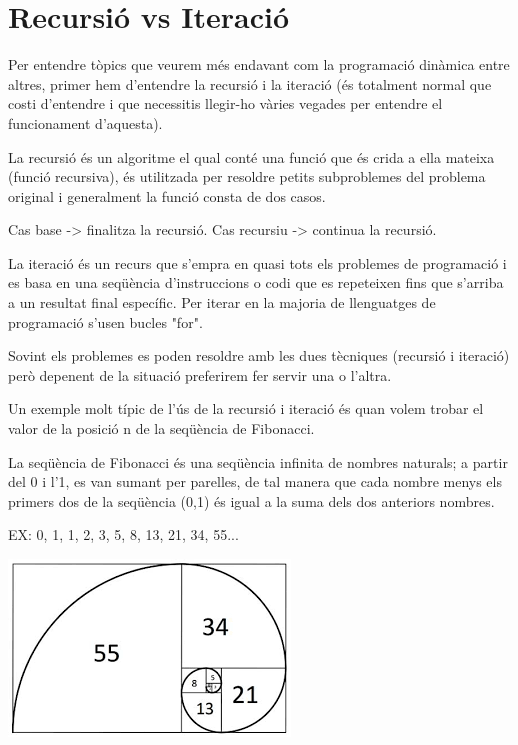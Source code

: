 \section{Recursió vs Iteració}

Per entendre tòpics que veurem més endavant com la programació dinàmica entre altres, primer hem d'entendre la recursió i la iteració (és totalment normal que costi d'entendre i que necessitis llegir-ho vàries vegades per entendre el funcionament d'aquesta). \newline

La recursió és un algoritme el qual conté una funció que és crida a ella mateixa (funció recursiva), és utilitzada per resoldre petits subproblemes del problema original i generalment la funció consta de dos casos. \newline

Cas base -> finalitza la recursió.
Cas recursiu -> continua la recursió. \newline

La iteració és un recurs que s'empra en quasi tots els problemes de programació i es basa en una seqüència d'instruccions o codi que es repeteixen fins que s'arriba a un resultat final específic.
Per iterar en la majoria de llenguatges de programació s'usen bucles "for". \newline

Sovint els problemes es poden resoldre amb les dues tècniques (recursió i iteració) però depenent de la situació preferirem fer servir una o l'altra. \newline

Un exemple molt típic de l'ús de la recursió i iteració és quan volem trobar el valor de la posició n de la seqüència de Fibonacci. \newline

La seqüència de Fibonacci és una seqüència infinita de nombres naturals; a partir del 0 i l'1, es van sumant per parelles, de tal manera que cada nombre menys els primers dos de la seqüència (0,1) és igual a la suma dels dos anteriors nombres. \newline

EX: 0, 1, 1, 2, 3, 5, 8, 13, 21, 34, 55... \newline

\begin{center}
\includegraphics[width= .6 \textwidth]{fib.png}
\end{center}

